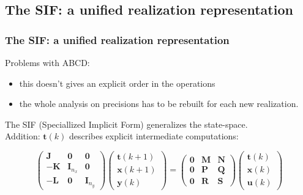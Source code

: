 



\subsection{The SIF: a unified realization representation }

\begin{frame}
	\frametitle{The SIF: a unified realization representation}
	Problems with ABCD:
	\begin{itemize}
		\item this doesn't gives an explicit order in the operations
		\item the whole analysis on precisions has to be rebuilt for each new realization.
	\end{itemize}

	The SIF (Speciallized Implicit Form) generalizes the state-space.\\
	Addition: $\boldsymbol{t}(k)$ describes explicit intermediate computations:

	\begin{equation} \label{sifdef}
		\begin{pmatrix}
			\boldsymbol{J} & \boldsymbol{0} & \boldsymbol{0} \\
			\boldsymbol{-K} & \boldsymbol{I}_{n_x} & \boldsymbol{0} \\
			\boldsymbol{-L} & \boldsymbol{0} & \boldsymbol{I}_{n_y} 
		\end{pmatrix}
		\begin{pmatrix}
			\boldsymbol{t} (k+1)  \\
			\boldsymbol{x} (k+1)  \\
			\boldsymbol{y} (k) 
		\end{pmatrix}
		=
		\begin{pmatrix}
			\boldsymbol{0} & \boldsymbol{M} & \boldsymbol{N} \\
			\boldsymbol{0} & \boldsymbol{P} & \boldsymbol{Q} \\
			\boldsymbol{0} & \boldsymbol{R} & \boldsymbol{S} 
		\end{pmatrix}
		\begin{pmatrix}
			\boldsymbol{t} (k)  \\
			\boldsymbol{x} (k)  \\
			\boldsymbol{u} (k) 
		\end{pmatrix}
	\end{equation}
\begingroup


\end{frame}
